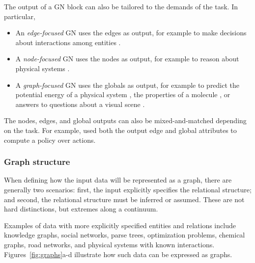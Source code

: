 The output of a GN block can also be tailored to the demands of the task.
In particular, 
\begin{itemize}[noitemsep]
\item An \emph{edge-focused} GN uses the edges as output, for example to make decisions about interactions among entities \citep{kipf2018neural,hamrick2018relational}.
\item A \emph{node-focused} GN uses the nodes as output, for example to reason about physical systems \citep{battaglia2016interaction,chang2016compositional,wang2018nervenet,sanchez2018graph}.
\item A \emph{graph-focused} GN uses the globals as output, for example to predict the potential energy of a physical system \citep{battaglia2016interaction}, the properties of a molecule \citep{gilmer2017neural}, or answers to questions about a visual scene \citep{santoro2017simple}.
\end{itemize}
The nodes, edges, and global outputs can also be mixed-and-matched depending on the task. For example, \cite{hamrick2018relational} used both the output edge and global attributes to compute a policy over actions.

\subsubsection{Graph structure}

When defining how the input data will be represented as a graph, there are generally two scenarios: first, the input explicitly specifies the relational structure; and second, the relational structure must be inferred or assumed. These are not hard distinctions, but extremes along a continuum.

Examples of data with more explicitly specified entities and relations include knowledge graphs, social networks, parse trees, optimization problems, chemical graphs, road networks, and physical systems with known interactions. Figures~\ref{fig:graphs}a-d illustrate how such data can be expressed as graphs. 

